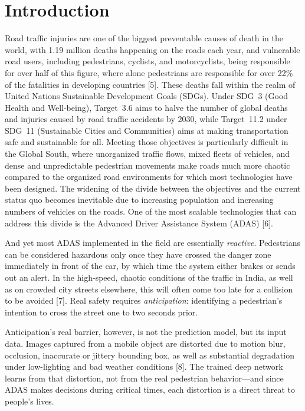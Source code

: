 \documentclass[conference]{IEEEtran}
\begin{document}
\section{Introduction}

Road traffic injuries are one of the biggest preventable causes of death in the world, with 1.19 million deaths happening on the roads each year, and vulnerable road users, including pedestrians, cyclists, and motorcyclists, being responsible for over half of this figure, where alone pedestrians are responsible for over 22\% of the fatalities in developing countries [5]. These deaths fall within the realm of United Nations Sustainable Development Goals (SDGs). Under SDG~3 (Good Health and Well-being), Target~3.6 aims to halve the number of global deaths and injuries caused by road traffic accidents by 2030, while Target~11.2 under SDG~11 (Sustainable Cities and Communities) aims at making transportation safe and sustainable for all.
Meeting those objectives is particularly difficult in the Global South, where unorganized traffic flows, mixed fleets of vehicles, and dense and unpredictable pedestrian movements make roads much more chaotic compared to the organized road environments for which most technologies have been designed. The widening of the divide between the objectives and the current status quo becomes inevitable due to increasing population and increasing numbers of vehicles on the roads. One of the most scalable technologies that can address this divide is the Advanced Driver Assistance System (ADAS) [6].

And yet most ADAS implemented in the field are essentially \emph{reactive}. Pedestrians can be considered hazardous only once they have crossed the danger zone immediately in front of the car, by which time the system either brakes or sends out an alert. In the high-speed, chaotic conditions of the traffic in India, as well as on crowded city streets elsewhere, this will often come too late for a collision to be avoided [7]. Real safety requires \emph{anticipation}: identifying a pedestrian's intention to cross the street one to two seconds prior.

Anticipation's real barrier, however, is not the prediction model, but its input data. Images captured from a mobile object are distorted due to motion blur, occlusion, inaccurate or jittery bounding box, as well as substantial degradation under low-lighting and bad weather conditions [8]. The trained deep network learns from that distortion, not from the real pedestrian behavior---and since ADAS makes decisions during critical times, each distortion is a direct threat to people's lives.
\end{document}
